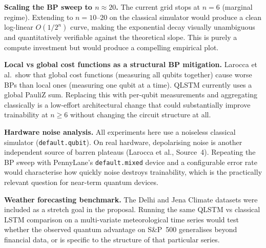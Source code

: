 \documentclass[10pt,twocolumn]{article}
\begin{document}
\textbf{Scaling the BP sweep to $n \approx 20$.} The current grid stops at $n{=}6$ (marginal regime). Extending to $n{=}10$--$20$ on the classical simulator would produce a clean log-linear $O(1/2^n)$ curve, making the exponential decay visually unambiguous and quantitatively verifiable against the theoretical slope. This is purely a compute investment but would produce a compelling empirical plot.

\textbf{Local vs global cost functions as a structural BP mitigation.} Larocca et al.\ show that global cost functions (measuring all qubits together) cause worse BPs than local ones (measuring one qubit at a time). QLSTM currently uses a global PauliZ sum. Replacing this with per-qubit measurements and aggregating classically is a low-effort architectural change that could substantially improve trainability at $n \ge 6$ without changing the circuit structure at all.

\textbf{Hardware noise analysis.} All experiments here use a noiseless classical simulator (\texttt{default.qubit}). On real hardware, depolarising noise is another independent source of barren plateaus (Larocca et al., Source~4). Repeating the BP sweep with PennyLane's \texttt{default.mixed} device and a configurable error rate would characterise how quickly noise destroys trainability, which is the practically relevant question for near-term quantum devices.

\textbf{Weather forecasting benchmark.} The Delhi and Jena Climate datasets were included as a stretch goal in the proposal. Running the same QLSTM vs classical LSTM comparison on a multi-variate meteorological time series would test whether the observed quantum advantage on S\&P~500 generalises beyond financial data, or is specific to the structure of that particular series.
\end{document}
